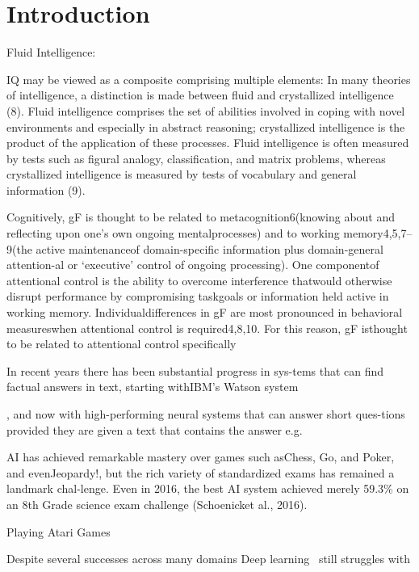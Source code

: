 \section{Introduction}

Fluid Intelligence:

IQ may be viewed as a composite comprising multiple elements: In many theories of intelligence, a distinction is made between fluid and crystallized intelligence (8). Fluid intelligence comprises the set of abilities involved in coping with novel environments and especially in abstract reasoning; crystallized intelligence is the product of the application of these processes. Fluid intelligence is often measured by tests such as figural analogy, classification, and matrix problems, whereas crystallized intelligence is measured by tests of vocabulary and general information (9). 
~\cite{sternberg2008increasing}

Cognitively, gF is thought to be related to metacognition6(knowing about and reflecting upon one’s own ongoing mentalprocesses) and to working memory4,5,7–9(the active maintenanceof domain-specific information plus domain-general attention-al or ‘executive’ control of ongoing processing). One componentof attentional control is the ability to overcome interference thatwould otherwise disrupt performance by compromising taskgoals or information held active in working memory. Individualdifferences in gF are most pronounced in behavioral measureswhen attentional control is required4,8,10. For this reason, gF isthought to be related to attentional control specifically~\cite{gray2003neural}


In recent years there has been substantial progress in sys-tems  that  can  find  factual  answers  in  text,  starting  withIBM’s Watson system~\cite{ferrucci2010building}

, and now with high-performing neural systems that can answer short ques-tions provided they are given a text that contains the answer e.g.~\cite{wang2018glue}


AI  has  achieved  remarkable  mastery  over  games  such  asChess, Go, and Poker, and evenJeopardy!, but the rich variety of standardized exams has remained a landmark chal-lenge.   Even  in  2016,  the  best  AI  system  achieved  merely 59.3\% on an 8th Grade science exam challenge (Schoenicket al., 2016).




Playing Atari Games~\cite{mnih2015human}


Despite several successes across many domains Deep learning~\cite{lecun2015deep} still struggles with

